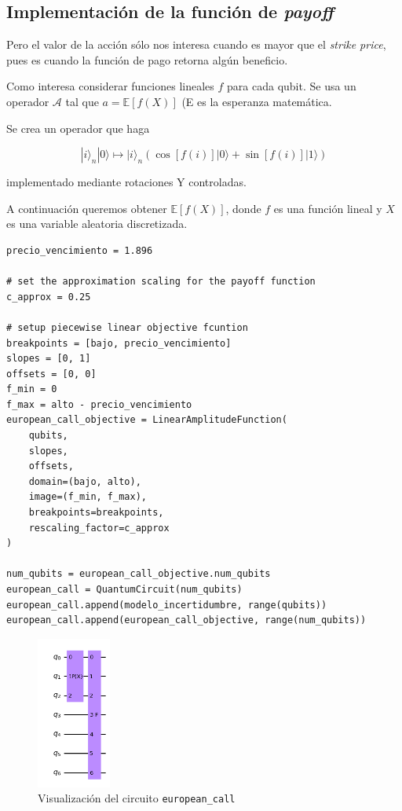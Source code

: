 \subsection{Implementación de la función de \textit{payoff}}
Pero el valor de la acción sólo nos interesa cuando es mayor que el \textit{strike price}, pues es cuando la función de pago retorna algún beneficio.

Como interesa considerar funciones lineales $f$ para cada qubit. Se usa un operador $\mathcal{A}$ tal que $a = \mathbb{E} [f(X)]$ (E es la esperanza matemática.

Se crea un operador que haga 

$$ |i\rangle_n|0\rangle \mapsto |i\rangle_n \left(\cos\left[f(i)\right]|0\rangle+\sin\left[f(i)\right]|1\rangle\right) $$

implementado mediante rotaciones Y controladas. 

A continuación queremos obtener $\mathbb{E}[f(X)]$, donde $f$ es una función lineal y $X$ es una variable aleatoria discretizada.

\begin{verbatim}
precio_vencimiento = 1.896

# set the approximation scaling for the payoff function
c_approx = 0.25

# setup piecewise linear objective fcuntion
breakpoints = [bajo, precio_vencimiento]
slopes = [0, 1]
offsets = [0, 0]
f_min = 0
f_max = alto - precio_vencimiento
european_call_objective = LinearAmplitudeFunction(
    qubits,
    slopes,
    offsets,
    domain=(bajo, alto),
    image=(f_min, f_max),
    breakpoints=breakpoints,
    rescaling_factor=c_approx
)

num_qubits = european_call_objective.num_qubits
european_call = QuantumCircuit(num_qubits) 
european_call.append(modelo_incertidumbre, range(qubits))
european_call.append(european_call_objective, range(num_qubits))
\end{verbatim}

\begin{figure}[h]
    \centering
    \includegraphics[height=5cm]{figures/notebooks/figura02.png}
    \caption{Visualización del circuito \texttt{european\_call}}
\end{figure}

